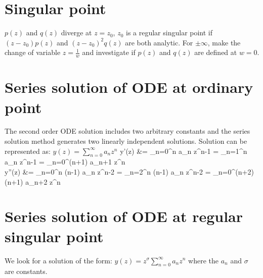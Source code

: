 \documentclass[12pt,twoside]{article}
\begin{document}
\section{Singular point}

$p(z)$ and $q(z)$ diverge at $z=z_0$, $z_0$ is a regular singular point if $(z-z_0) p(z)$ and $(z-z_0)^2 q(z)$ are both analytic.
For $\pm \infty$, make the change of variable $z = \frac{1}{w}$ and investigate if $p(z)$ and $q(z)$ are defined at $w=0$.

\section{Series solution of ODE at ordinary point}
The second order ODE solution includes two arbitrary constants and the series solution method generates two linearly independent solutions.
Solution can be represented as: $y(z) = \sum_{n=0}^\infty a_n z^n$
\ba
	y'(z) &=  \sum_{n=0}^\infty n a_n z^{n-1} =  \sum_{n=1}^\infty n a_n z^{n-1}  = \sum_{n=0}^\infty (n+1) a_{n+1} z^n\\
	y''(z) &=  \sum_{n=0}^\infty n (n-1) a_n z^{n-2} =  \sum_{n=2}^\infty n (n-1) a_n z^{n-2}  = \sum_{n=0}^\infty (n+2) (n+1) a_{n+2} z^n \\
\ea

\section{Series solution of ODE at regular singular point}

We look for a solution of the form: $y(z) = z^\sigma \sum_{n=0}^\infty a_n z^n$ where the $a_n$ and $\sigma$ are constants.
\end{document}
